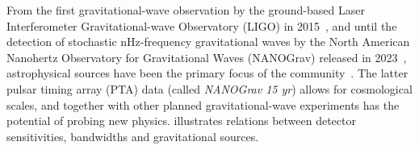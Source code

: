 



















From the first gravitational-wave observation by the ground-based Laser Interferometer Gravitational-wave Observatory (LIGO) in 2015~\citep{abbottObservationGravitationalWaves2016}, %
and until the detection of stochastic nHz-frequency gravitational waves by the North American Nanohertz Observatory for Gravitational Waves (NANOGrav) released in 2023~\citep{agazieNANOGrav15Yr2023a}, astrophysical sources have been the primary focus of the community~\citep{liProbingHighTemperature2023}. The latter pulsar timing array (PTA) data (called \textit{NANOGrav 15 yr}) allows for cosmological scales, and together with other planned gravitational-wave experiments has the potential of probing new physics.  illustrates relations between detector sensitivities, bandwidths and gravitational sources. 

